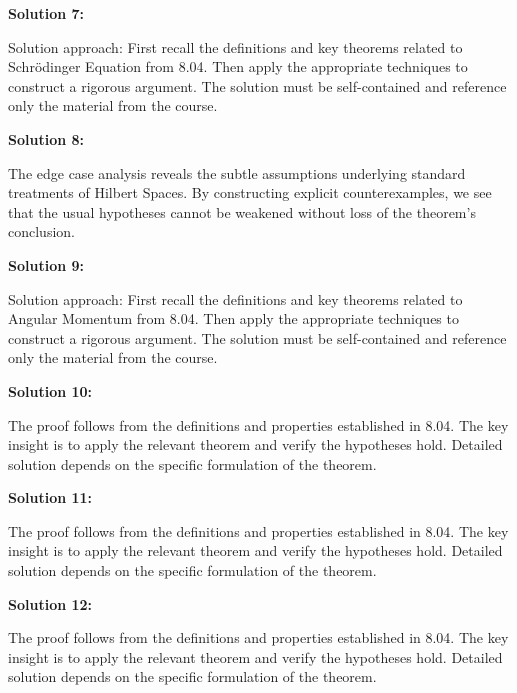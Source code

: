 \documentclass[12pt,a4paper]{exam}
\begin{document}
\vspace{0.5cm}

\textbf{Solution 7:}

Solution approach: First recall the definitions and key theorems related to Schrödinger Equation from 8.04. Then apply the appropriate techniques to construct a rigorous argument. The solution must be self-contained and reference only the material from the course.

\vspace{0.5cm}

\textbf{Solution 8:}

The edge case analysis reveals the subtle assumptions underlying standard treatments of Hilbert Spaces. By constructing explicit counterexamples, we see that the usual hypotheses cannot be weakened without loss of the theorem's conclusion.

\vspace{0.5cm}

\textbf{Solution 9:}

Solution approach: First recall the definitions and key theorems related to Angular Momentum from 8.04. Then apply the appropriate techniques to construct a rigorous argument. The solution must be self-contained and reference only the material from the course.

\vspace{0.5cm}

\textbf{Solution 10:}

The proof follows from the definitions and properties established in 8.04. The key insight is to apply the relevant theorem and verify the hypotheses hold. Detailed solution depends on the specific formulation of the theorem.

\vspace{0.5cm}

\textbf{Solution 11:}

The proof follows from the definitions and properties established in 8.04. The key insight is to apply the relevant theorem and verify the hypotheses hold. Detailed solution depends on the specific formulation of the theorem.

\vspace{0.5cm}

\textbf{Solution 12:}

The proof follows from the definitions and properties established in 8.04. The key insight is to apply the relevant theorem and verify the hypotheses hold. Detailed solution depends on the specific formulation of the theorem.
\end{document}
